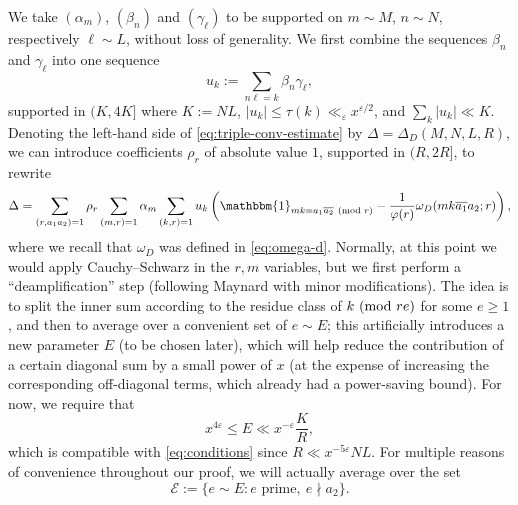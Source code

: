 \documentclass[reqno,11pt]{amsart}
\theoremstyle{definition}
\theoremstyle{remark}
\numberwithin{equation}{section}
\newcommand{\msE}{\mathscr{E}}
\newcommand{\one}{\mathbbm{1}}
\newcommand{\eps}{\varepsilon}
\renewcommand{\bar}{\overline}
\renewcommand{\pmod}[1]{\ (\textnormal{mod } #1)}
\begin{document}
We take $(\alpha_m)$, $(\beta_n)$ and $(\gamma_\ell)$ to be supported on $m \sim M$, $n \sim N$, respectively $\ell \sim L$, without loss of generality.
We first combine the sequences $\beta_n$ and $\gamma_\ell$ into one sequence
\begin{equation} \label{eq:u-def}
    u_k := \sum_{n\ell = k} \beta_n \gamma_\ell,
\end{equation}
supported in $(K, 4K]$ where $K := NL$, $|u_k| \le \tau(k) \ll_\eps x^{\eps/2}$, and $\sum_k |u_k| \ll K$. Denoting the left-hand side of \cref{eq:triple-conv-estimate} by $\Delta = \Delta_D(M,N,L,R)$, we can introduce coefficients $\rho_r$ of absolute value $1$, supported in $(R, 2R]$, to rewrite
\[
    \Delta
    =
    \sum_{(r,a_1a_2)=1} \rho_r \sum_{(m, r) = 1} \alpha_m \sum_{(k, r) = 1} u_k \left(\one_{mk \equiv a_1 \bar{a_2} \pmod{r}} - \frac{1}{\varphi(r)} \omega_D(mk \bar{a_1}a_2; r) \right),
\]
where we recall that $\omega_D$ was defined in \cref{eq:omega-d}. Normally, at this point we would apply Cauchy--Schwarz in the $r, m$ variables, but we first perform a ``deamplification'' step (following Maynard \cite{maynard2020primes} with minor modifications). The idea is to split the inner sum according to the residue class of $k \pmod{re}$ for some $e \ge 1$, and then to average over a convenient set of $e \sim E$; this artificially introduces a new parameter $E$ (to be chosen later), which will help reduce the contribution of a certain diagonal sum by a small power of $x$ (at the expense of increasing the corresponding off-diagonal terms, which already had a power-saving bound). For now, we require that
\begin{equation} \label{eq:E-conditions}
    x^{4\eps} \le E \ll x^{-\eps} \frac{K}{R},
\end{equation}
which is compatible with \cref{eq:conditions} since $R \ll x^{-5\eps} NL$. For multiple reasons of convenience throughout our proof, we will actually average over the set
\begin{equation} \label{eq:averaging-set}
    \msE := \{e \sim E : e \text{ prime},\ e \nmid a_2\}.
\end{equation}
\end{document}
